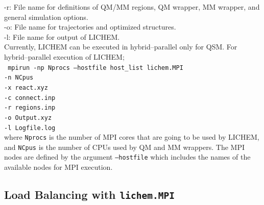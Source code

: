 \documentclass[12pt]{report}
\begin{document}
-r: File name for definitions of QM/MM regions, QM wrapper, MM wrapper,
and general simulation options. \\

-o: File name for trajectories and optimized structures.\\

-l: File name for output of LICHEM.\\

Currently, LICHEM can be executed in hybrid--parallel only for QSM. 
For hybrid--parallel execution of LICHEM;\\

\texttt{
\hspace{0.35in} mpirun -np Nprocs --hostfile host_list 
lichem.MPI \\
\hspace*{1.1in} -n NCpus \\
\hspace*{1.1in} -x react.xyz \\
\hspace*{1.1in} -c connect.inp \\
\hspace*{1.1in} -r regions.inp \\
\hspace*{1.1in} -o Output.xyz \\
\hspace*{1.1in} -l Logfile.log
}\\

\noindent where \texttt{Nprocs} 
is the number of MPI cores that 
are going to be used by LICHEM, and \texttt{NCpus} 
is the number of CPUs used 
by QM and MM wrappers. 
The MPI nodes are defined by the argument \texttt{--hostfile} 
which includes the names of the available nodes for
MPI execution. 

\subsection{Load Balancing with \texttt{lichem.MPI}}
\end{document}
